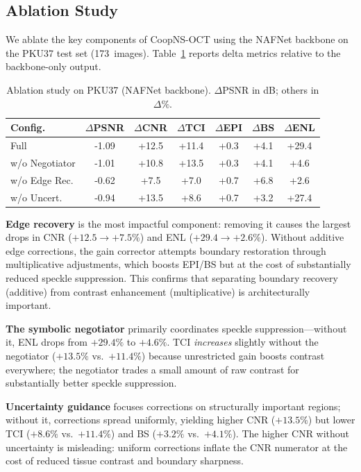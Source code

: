 \documentclass{ieeetj}
\begin{document}
\subsection{Ablation Study}
\label{sec:ablation}

We ablate the key components of CoopNS-OCT using the NAFNet backbone on the PKU37 test set (173~images). Table~\ref{tab:ablation} reports delta metrics relative to the backbone-only output.

\begin{table}[t]
\centering
\caption{Ablation study on PKU37 (NAFNet backbone). $\Delta$PSNR in dB; others in $\Delta\%$.}
\label{tab:ablation}
\setlength{\tabcolsep}{2.5pt}
\footnotesize
\begin{tabular}{lcccccc}
\toprule
Config. & $\Delta$PSNR & $\Delta$CNR & $\Delta$TCI & $\Delta$EPI & $\Delta$BS & $\Delta$ENL \\
\midrule
Full & -1.09 & +12.5 & +11.4 & +0.3 & +4.1 & +29.4 \\
w/o Negotiator & -1.01 & +10.8 & +13.5 & +0.3 & +4.1 & +4.6 \\
w/o Edge Rec. & -0.62 & +7.5 & +7.0 & +0.7 & +6.8 & +2.6 \\
w/o Uncert. & -0.94 & +13.5 & +8.6 & +0.7 & +3.2 & +27.4 \\
\bottomrule
\end{tabular}
\end{table}

\textbf{Edge recovery} is the most impactful component: removing it causes the largest drops in CNR ($+12.5 \to +7.5\%$) and ENL ($+29.4 \to +2.6\%$). Without additive edge corrections, the gain corrector attempts boundary restoration through multiplicative adjustments, which boosts EPI/BS but at the cost of substantially reduced speckle suppression. This confirms that separating boundary recovery (additive) from contrast enhancement (multiplicative) is architecturally important.

\textbf{The symbolic negotiator} primarily coordinates speckle suppression---without it, ENL drops from $+29.4\%$ to $+4.6\%$. TCI \emph{increases} slightly without the negotiator ($+13.5\%$ vs.\ $+11.4\%$) because unrestricted gain boosts contrast everywhere; the negotiator trades a small amount of raw contrast for substantially better speckle suppression.

\textbf{Uncertainty guidance} focuses corrections on structurally important regions; without it, corrections spread uniformly, yielding higher CNR ($+13.5\%$) but lower TCI ($+8.6\%$ vs.\ $+11.4\%$) and BS ($+3.2\%$ vs.\ $+4.1\%$). The higher CNR without uncertainty is misleading: uniform corrections inflate the CNR numerator at the cost of reduced tissue contrast and boundary sharpness.
\end{document}
